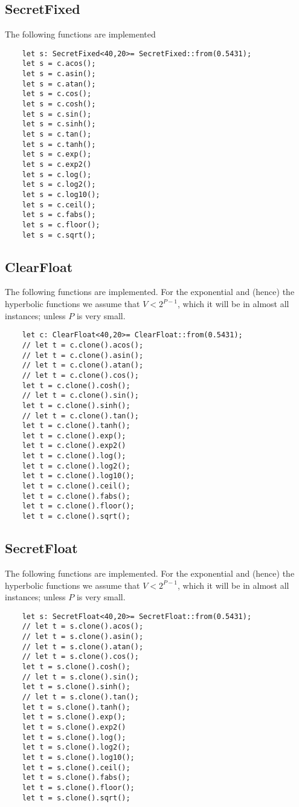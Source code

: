 \subsection{SecretFixed}
The following functions are implemented
\begin{lstlisting}
    let s: SecretFixed<40,20>= SecretFixed::from(0.5431);
    let s = c.acos();
    let s = c.asin();
    let s = c.atan();
    let s = c.cos();
    let s = c.cosh();
    let s = c.sin();
    let s = c.sinh();
    let s = c.tan();
    let s = c.tanh();
    let s = c.exp();
    let s = c.exp2()
    let s = c.log();
    let s = c.log2();
    let s = c.log10();
    let s = c.ceil();
    let s = c.fabs();
    let s = c.floor();
    let s = c.sqrt();
\end{lstlisting}


\subsection{ClearFloat}
The following functions are implemented.
For the exponential and (hence) the hyperbolic functions we assume
that $V < 2^{P-1}$, which it will be in almost all instances;
unless $P$ is very small.
\begin{lstlisting}
    let c: ClearFloat<40,20>= ClearFloat::from(0.5431);
    // let t = c.clone().acos();
    // let t = c.clone().asin();
    // let t = c.clone().atan();
    // let t = c.clone().cos();
    let t = c.clone().cosh();
    // let t = c.clone().sin();
    let t = c.clone().sinh();
    // let t = c.clone().tan();
    let t = c.clone().tanh();
    let t = c.clone().exp();
    let t = c.clone().exp2()
    let t = c.clone().log();
    let t = c.clone().log2();
    let t = c.clone().log10();
    let t = c.clone().ceil();
    let t = c.clone().fabs();
    let t = c.clone().floor();
    let t = c.clone().sqrt();
\end{lstlisting}

\subsection{SecretFloat}
The following functions are implemented.
For the exponential and (hence) the hyperbolic functions we assume
that $V < 2^{P-1}$, which it will be in almost all instances;
unless $P$ is very small.
\begin{lstlisting}
    let s: SecretFloat<40,20>= SecretFloat::from(0.5431);
    // let t = s.clone().acos();
    // let t = s.clone().asin();
    // let t = s.clone().atan();
    // let t = s.clone().cos();
    let t = s.clone().cosh();
    // let t = s.clone().sin();
    let t = s.clone().sinh();
    // let t = s.clone().tan();
    let t = s.clone().tanh();
    let t = s.clone().exp();
    let t = s.clone().exp2()
    let t = s.clone().log();
    let t = s.clone().log2();
    let t = s.clone().log10();
    let t = s.clone().ceil();
    let t = s.clone().fabs();
    let t = s.clone().floor();
    let t = s.clone().sqrt();

\end{lstlisting}
